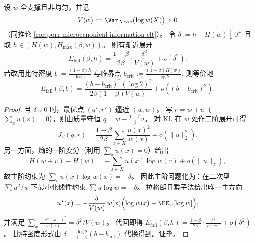 \begin{theorem}\label{thm:pom-microcanonical-two-temperature-critical-quadratic-law}
设 \(w\) 全支撑且非均匀，并记
\[
V(w):=\Var_{X\sim w}\bigl(\log w(X)\bigr)>0
\]
（同推论 \ref{cor:pom-microcanonical-information-clt}）。
令 \(\delta:=h-H(w)\downarrow 0^+\) 且取 \(h\in(H(w),H_{\max}(\beta,w))\)。
则有渐近展开
\[
E_{\mathrm{fail}}(\beta,h)
=\frac{1-\beta}{2\beta}\cdot \frac{\delta^2}{V(w)}+o(\delta^2).
\]
若改用比特密度
\(
b:=\frac{(1-\beta)h}{\log 2}
\)
与临界点
\(
b_{\mathrm{crit}}:=\frac{(1-\beta)H(w)}{\log 2}
\),
则等价地
\[
E_{\mathrm{fail}}(\beta,b)
=\frac{(b-b_{\mathrm{crit}})^2(\log 2)^2}{2\beta(1-\beta)V(w)}+o\!\left((b-b_{\mathrm{crit}})^2\right).
\]
\end{theorem}
\begin{proof}
当 \(\delta\downarrow 0\) 时，最优点 \((q^\star,r^\star)\) 逼近 \((w,w)\)。
写 \(r=w+u\)（\(\sum_x u(x)=0\)），则由质量守恒 \(q=w-\frac{1-\beta}{\beta}u\)。
对 KL 在 \(w\) 处作二阶展开可得
\[
J_\beta(q,r)
=\frac{1-\beta}{2\beta}\sum_{x\in X}\frac{u(x)^2}{w(x)}+o(\|u\|_2^2).
\]
另一方面，熵的一阶变分（利用 \(\sum_x u(x)=0\)）给出
\[
H(w+u)-H(w)=-\sum_{x\in X}u(x)\log w(x)+o(\|u\|_2),
\]
故主阶约束为 \(\sum_x u(x)\log w(x)=-\delta\)。
因此主阶问题化为：在二次型 \(\sum u^2/w\) 下最小化线性约束 \(\sum u\log w=-\delta\)。
拉格朗日乘子法给出唯一主方向
\[
u^\star(x)=-\frac{\delta}{V(w)}\,w(x)\Bigl(\log w(x)-\EE_w[\log w]\Bigr),
\]
并满足
\(
\sum_x\frac{(u^\star(x))^2}{w(x)}=\delta^2/V(w)
\)。
代回即得
\(
E_{\mathrm{fail}}(\beta,h)=\frac{1-\beta}{2\beta}\cdot \frac{\delta^2}{V(w)}+o(\delta^2)
\)。
比特密度形式由 \(\delta=\frac{\log 2}{1-\beta}(b-b_{\mathrm{crit}})\) 代换得到。证毕。
\end{proof}
